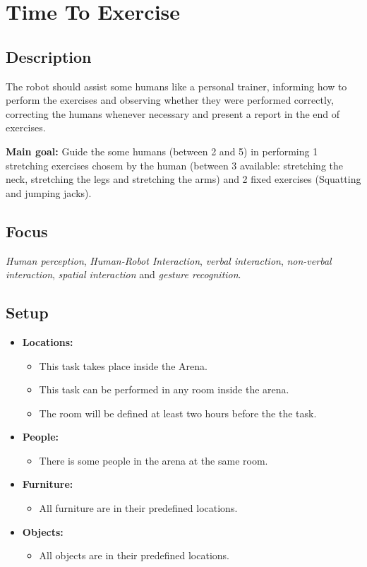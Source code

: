 \section{Time To Exercise}\label{test:time-to-exercise}

\subsection*{Description}
The robot should assist some humans like a personal trainer, informing how to perform the exercises and observing whether they were performed correctly, correcting the humans whenever necessary and present a report in the end of exercises.

\textbf{Main goal:}
Guide the some humans (between 2 and 5) in performing 1 stretching exercises chosem by the human (between 3 available: stretching the neck, stretching the legs and stretching the arms) and 2 fixed exercises (Squatting and jumping jacks).

\subsection*{Focus}
\emph{Human perception}, 
\emph{Human-Robot Interaction}, 
\emph{verbal interaction}, 
\emph{non-verbal interaction}, 
\emph{spatial interaction} and
\emph{gesture recognition}.

\subsection*{Setup}
\begin{itemize}[nosep]	
	\item \textbf{Locations:} 
	\begin{itemize}
		\item This task takes place inside the Arena.
		\item This task can be performed in any room inside the arena.
		\item The room will be defined at least two hours before the the task.
	\end{itemize}	 
	\item \textbf{People:} 
	\begin{itemize}
		\item There is some people in the arena at the same room.
	\end{itemize}
	\item \textbf{Furniture:}
	\begin{itemize}
		\item All furniture are in their predefined locations.
	\end{itemize}
	\item \textbf{Objects:}
	\begin{itemize}
		\item All objects are in their predefined locations.
	\end{itemize}
\end{itemize}

